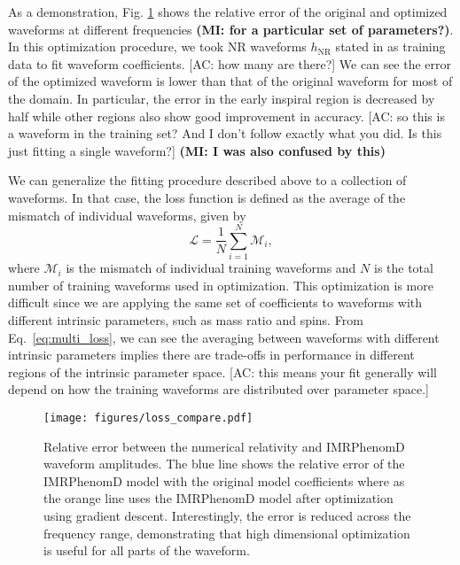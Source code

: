 \documentclass[twocolumn]{aastex631}
\newcommand{\mi}[1]{\textbf{\color{teal}(MI: #1)}}
\newcommand{\amc}[1]{{\color{red}[AC: #1]}}
\begin{document}
As a demonstration, Fig. \ref{fig:loss_compare} shows the relative error of
the original and optimized waveforms at different frequencies \mi{for a particular set of parameters?}. In this optimization
procedure, we took NR waveforms $h_{\mathrm{NR}}$ stated in \citep{Khan:2015jqa}
as training data to fit waveform coefficients. \amc{how many are there?}
We can see the error of the optimized waveform is lower than that of the original waveform for most of the domain.
In particular, the error in the early inspiral region is decreased by half while other regions also show good improvement in accuracy. \amc{so this is a waveform in the training set? And I don't follow exactly what you did. Is this just fitting a single waveform?}
\mi{I was also confused by this}

We can generalize the fitting procedure described above to a collection of waveforms.
In that case, the loss function is defined as the average of the mismatch of
individual waveforms, given by
\begin{equation}
	\mathcal{L}=\frac{1}{N}\sum_{i=1}^{N}\mathcal{M}_i,
    \label{eq:multi_loss}
\end{equation}
where $\mathcal{M}_i$ is the mismatch of individual training waveforms and $N$
is the total number of training waveforms used in optimization. This
optimization is more difficult since we are applying the same set of
coefficients to waveforms with different intrinsic parameters, such as mass
ratio and spins. From Eq.~\eqref{eq:multi_loss}, we can see the averaging between
waveforms with different intrinsic parameters implies there are trade-offs in
performance in different regions of the intrinsic parameter space.
\amc{this means your fit generally will depend on how the training waveforms are distributed over parameter space.}

\begin{figure}[t]
	\begin{centering}
		\texttt{[image: figures/loss\_compare.pdf]}
		\caption{
			Relative error between the numerical relativity and IMRPhenomD waveform amplitudes. 
            The blue line shows the relative error of the IMRPhenomD model with the original model coefficients where as the orange line uses the IMRPhenomD model after optimization using gradient descent.
            Interestingly, the error is reduced across the frequency range, demonstrating that high dimensional optimization is useful for all parts of the waveform.
		}
		\label{fig:loss_compare}
	\end{centering}
\end{figure}
\end{document}

